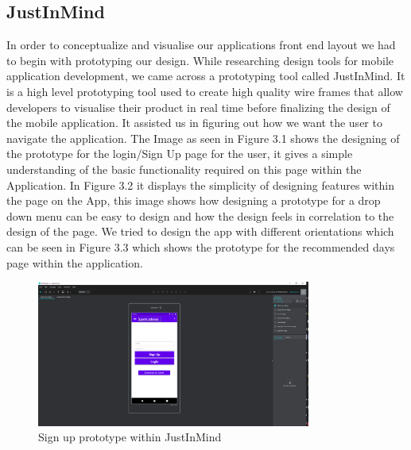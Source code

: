 \subsection{JustInMind}
In order to conceptualize and visualise our applications front end layout we had to begin with prototyping our design. While researching design tools for mobile application development, we came across a prototyping tool called JustInMind.
\newline
\newline
It is a high level prototyping tool used to create high quality wire frames that allow developers to visualise their product in real time before finalizing the design of the mobile application. It assisted us in figuring out how we want the user to navigate the application.
\newline
\newline
The Image as seen in Figure 3.1 shows the designing of the prototype for the login/Sign Up page for the user, it gives a simple understanding of the basic functionality required on this page within the Application.
\newline
\newline
In Figure 3.2 it displays the simplicity of designing features within the page on the App, this image shows how designing a prototype for a drop down menu can be easy to design and how the design feels in correlation to the design of the page.
\newline
\newline
We tried to design the app with different orientations which can be seen in Figure 3.3 which shows the prototype for the recommended days page within the application.

\begin{figure}[H]
    \centering
    \includegraphics[width=9cm]{img/SignUpImage.PNG}
    \caption{Sign up prototype within JustInMind}
    \label{fig:altas config}
\end{figure}

